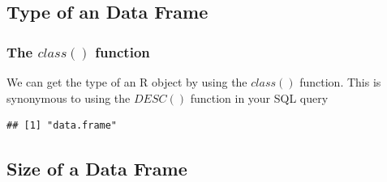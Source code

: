 \subsection{Type of an Data Frame}
\subsubsection{The $class()$ function}
\noindent We can get the type of an R object by using the $class()$ function. This is synonymous to using the $DESC()$ function in your SQL query  
\begin{knitrout}
\color{fgcolor}\begin{kframe}
\begin{alltt}
 
\end{alltt}
\begin{verbatim}
## [1] "data.frame"
\end{verbatim}
\end{kframe}
\end{knitrout}
\subsection{Size of a Data Frame}
